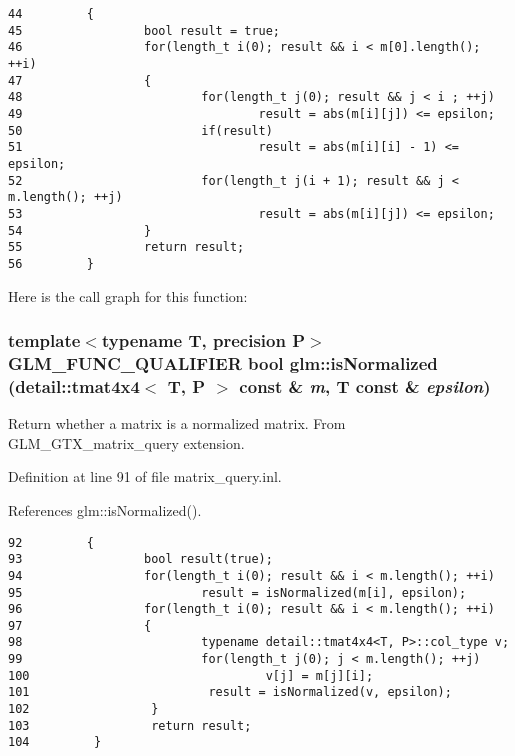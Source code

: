 \begin{Code}\begin{verbatim}44         {
45                 bool result = true;
46                 for(length_t i(0); result && i < m[0].length(); ++i)
47                 {
48                         for(length_t j(0); result && j < i ; ++j)
49                                 result = abs(m[i][j]) <= epsilon;
50                         if(result)
51                                 result = abs(m[i][i] - 1) <= epsilon;
52                         for(length_t j(i + 1); result && j < m.length(); ++j)
53                                 result = abs(m[i][j]) <= epsilon;
54                 }
55                 return result;
56         }
\end{verbatim}
\end{Code}




Here is the call graph for this function:\hypertarget{group__gtx__matrix__query_g0005612df8bcf46d6dda35d373a61fbb}{
\subsubsection[isNormalized]{\setlength{\rightskip}{0pt plus 5cm}template$<$typename T, precision P$>$ GLM\_\-FUNC\_\-QUALIFIER bool glm::isNormalized (detail::tmat4x4$<$ T, P $>$ const \& {\em m}, \/  T const \& {\em epsilon})}}
\label{group__gtx__matrix__query_g0005612df8bcf46d6dda35d373a61fbb}


Return whether a matrix is a normalized matrix. From GLM\_\-GTX\_\-matrix\_\-query extension. 

Definition at line 91 of file matrix\_\-query.inl.

References glm::isNormalized().

\begin{Code}\begin{verbatim}92         {
93                 bool result(true);
94                 for(length_t i(0); result && i < m.length(); ++i)
95                         result = isNormalized(m[i], epsilon);
96                 for(length_t i(0); result && i < m.length(); ++i)
97                 {
98                         typename detail::tmat4x4<T, P>::col_type v;
99                         for(length_t j(0); j < m.length(); ++j)
100                                 v[j] = m[j][i];
101                         result = isNormalized(v, epsilon);
102                 }
103                 return result;
104         }
\end{verbatim}
\end{Code}




